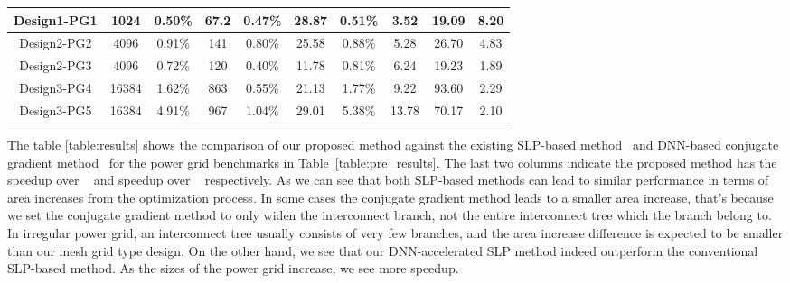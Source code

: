 \begin{table*}[h]
\begin{center}
{\begin{tabular}{| c| c | c | c | c | c | c  | c | c | c | }
				Design1-PG1  &1024     &0.50\%  &67.2     &0.47\%  &28.87  &0.51\%  &3.52    &19.09     &8.20 \\ \hline
				Design2-PG2  &4096     &0.91\%    &141      &0.80\%  &25.58  &0.88\%  &5.28    &26.70     &4.83\\ \hline
				Design2-PG3  &4096     &0.72\%   &120      &0.40\% &11.78  &0.81\%  &6.24    &19.23     &1.89\\ \hline
				Design3-PG4  &16384   &1.62\%    &863      &0.55\% &21.13  &1.77\%  &9.22    &93.60     &2.29\\ \hline
                			Design3-PG5  &16384   &4.91\%    &967      &1.04\% &29.01  &5.38\%  &13.78  &70.17    &2.10\\ \hline
			\end{tabular}
			}
	\end{center}
	\vspace{-0.1in}
      \end{table*}
      
      The table \ref{table:results} shows the comparison of our
      proposed method against the existing SLP-based
      method~\cite{Sukharev:2019pg} and DNN-based conjugate gradient
      method~\cite{HanLiu:TCAD'22-23} for the power grid benchmarks in
      Table~\ref{table:pre_results}. The last two columns indicate
      the proposed method has the speedup over ~\cite{Sukharev:2019pg}
      and speedup over ~\cite{HanLiu:TCAD'22-23} respectively.
      As we can see that both SLP-based
      methods can lead to similar performance in terms of area
      increases from the optimization process. In some cases the
      conjugate gradient method leads to a smaller area increase,
      that's because we set the conjugate gradient method to only
      widen the interconnect branch, not the entire interconnect tree
      which the branch belong to. In irregular power grid, an
      interconnect tree usually consists of very few branches, and the
      area increase difference is expected to be smaller than our mesh grid type design.
      On the other hand, we see that our DNN-accelerated SLP method indeed
      outperform the conventional SLP-based method. As the sizes of
      the power grid increase, we see more speedup. %
      
